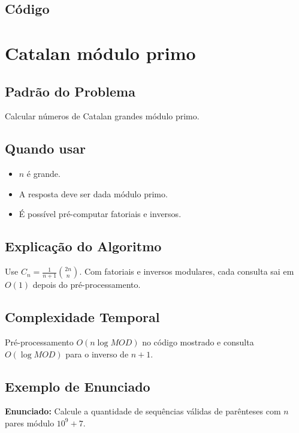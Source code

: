 \subsection{Código}

\section{Catalan módulo primo}

\subsection{Padrão do Problema}
Calcular números de Catalan grandes módulo primo.

\subsection{Quando usar}
\begin{itemize}[nosep]
  \item $n$ é grande.
  \item A resposta deve ser dada módulo primo.
  \item É possível pré-computar fatoriais e inversos.
\end{itemize}

\subsection{Explicação do Algoritmo}
Use $C_n=\frac{1}{n+1}\binom{2n}{n}$. Com fatoriais e inversos modulares, cada consulta sai em $O(1)$ depois do pré-processamento.

\subsection{Complexidade Temporal}
Pré-processamento $O(n\log MOD)$ no código mostrado e consulta $O(\log MOD)$ para o inverso de $n+1$.

\subsection{Exemplo de Enunciado}
\begin{exemplodiabox}
\textbf{Enunciado:} Calcule a quantidade de sequências válidas de parênteses com $n$ pares módulo $10^9+7$.
\end{exemplodiabox}

